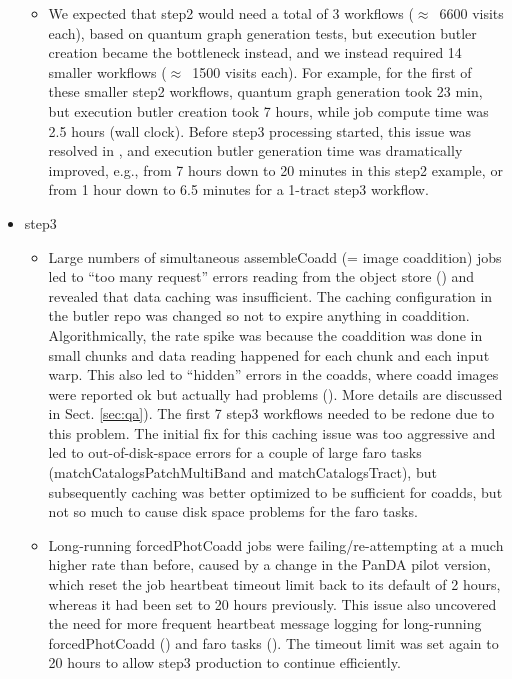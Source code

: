 \begin{itemize}
\begin{itemize}
 \item
 We expected that step2 would need a total of 3 workflows ($\approx$~6600 visits each), based on quantum graph generation tests, but execution butler creation became the bottleneck instead, and we instead required 14 smaller workflows ($\approx$~1500 visits each).
 For example, for the first of these smaller step2 workflows, quantum graph generation took 23 min, but execution butler creation took 7 hours, while job compute time was 2.5 hours (wall clock).
 Before step3 processing started, this issue was resolved in , and execution butler generation time was dramatically improved, e.g., from 7 hours down to 20 minutes in this step2 example, or from 1 hour down to 6.5 minutes for a 1-tract step3 workflow.

\end{itemize} %

\item step3
\begin{itemize}

  \item
  Large numbers of simultaneous assembleCoadd (= image coaddition) jobs led to ``too many request'' errors reading from the object store () and revealed that data caching was insufficient.
  The caching configuration in the butler repo was changed so not to expire anything in coaddition.
  Algorithmically, the rate spike was because the coaddition was done in small chunks and data reading happened for each chunk and each input warp.
  This also led to ``hidden'' errors in the coadds, where coadd images were reported ok but actually had problems ().
  More details are discussed in Sect. \ref{sec:qa}).
  The first 7 step3 workflows needed to be redone due to this problem.
  The initial fix for this caching issue was too aggressive and led to out-of-disk-space errors for a couple of large faro tasks (matchCatalogsPatchMultiBand and matchCatalogsTract), but subsequently caching was better optimized to be sufficient for coadds, but not so much to cause disk space problems for the faro tasks.

  \item
  Long-running forcedPhotCoadd jobs were failing/re-attempting at a much higher rate than before, caused by a change in the PanDA pilot version, which reset the job heartbeat timeout limit back to its default of 2 hours, whereas it had been set to 20 hours previously.
  This issue also uncovered the need for more frequent heartbeat message logging for long-running forcedPhotCoadd () and faro tasks ().
  The timeout limit was set again to 20 hours to allow step3 production to continue efficiently.


\end{itemize}
\end{itemize}
